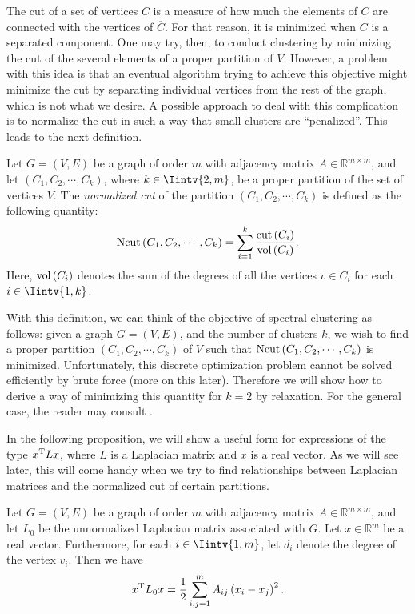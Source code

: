 The cut of a set of vertices $C$ is a measure of how much the elements of $C$ are connected with the vertices of $\overline C$.
For that reason, it is minimized when $C$ is a separated component. 
One may try, then, to conduct clustering by minimizing the cut of the several elements of a proper partition of $V$.
However, a problem with this idea is that an eventual algorithm trying to achieve this objective might minimize the cut by separating individual vertices from the rest of the graph, which is not what we desire.
A possible approach to deal with this complication is to normalize the cut in such a way that small clusters are ``penalized''.
This leads to the next definition.

\begin{definition}
   Let $G = (V,E)$ be a graph of order $m$ with adjacency matrix $A \in \mathbb R^{m \times m}$, and let $(C_1, C_2, \cdots, C_k)$, where $k \in \Iintv{2,m}$, be a proper partition of the set of vertices $V$.
   The \textit{normalized cut} of the partition $(C_1, C_2, \cdots, C_k)$ is defined as the following quantity:
   \begin{equation}
      \operatorname*{Ncut\,} (C_1, C_2, \cdots, C_k) = \sum _{i = 1}^k \frac{\operatorname{cut\,} (C_i)}{\operatorname*{vol\,}(C_i)}.
   \end{equation}
   Here, $\operatorname*{vol\,} (C_i)$ denotes the sum of the degrees of all the vertices $v \in C_i$ for each $i \in \Iintv{1,k}$.
\end{definition}

With this definition, we can think of the objective of spectral clustering as follows: given a graph $G=(V,E)$, and the number of clusters $k$, we wish to find a proper partition $(C_1, C_2, \cdots, C_k)$ of $V$ such that $\operatorname*{Ncut\,} (C_1, C_2, \cdots, C_k)$ is minimized. Unfortunately, this discrete optimization problem cannot be solved efficiently by brute force (more on this later). Therefore we will show how to derive a way of minimizing this quantity for $k = 2$ by relaxation. For the general case, the reader may consult \cite{tutorial}.

In the following proposition, we will show a useful form for expressions of the type $x^{\rm T}Lx$, where $L$ is a Laplacian matrix and $x$ is a real vector.
As we will see later, this will come handy when we try to find relationships between Laplacian matrices and the normalized cut of certain partitions.

\begin{proposition}\label{xtlx}
   Let $G = (V,E)$ be a graph of order $m$ with adjacency matrix $A \in \mathbb R^{m \times m}$, and let $L_0$ be the unnormalized Laplacian matrix associated with $G$. Let $x \in \mathbb R^{m }$ be a real vector. Furthermore, for each $i \in \Iintv{1,m}$, let $d_i$ denote the degree of the vertex $v_i$. Then we have
   \begin{equation}
      x^{\rm T}L_0x = \frac{1}{2}\sum_{i,j = 1}^m A_{ij} \left( x_i - x_j \right)^2.
   \end{equation}
\end{proposition}

